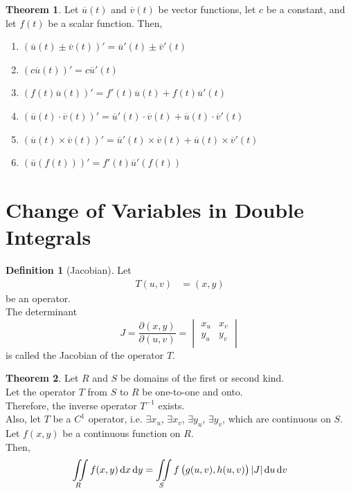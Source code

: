 \documentclass[fleqn, a4paper, 12pt, twoside]{article}
\theoremstyle{definition}
\newtheorem{definition}{Definition}
\theoremstyle{theorem}
\newtheorem{theorem}{Theorem}
\begin{document}
{\begin{theorem}
	Let $\overline{u}(t)$ and $\overline{v}(t)$ be vector functions, let $c$ be a constant, and let $f(t)$ be a scalar function.
	Then,
	\begin{enumerate}
		\item $\left( \overline{u}(t) \pm \overline{v}(t) \right)' = \overline{u}'(t) \pm \overline{v}'(t)$
		\item $\left( c \overline{u}(t) \right)' = c \overline{u}'(t)$
		\item $\left( f(t) \overline{u}(t) \right)' = f'(t) \overline{u}(t) + f(t) \overline{u}'(t)$
		\item $\left( \overline{u}(t) \cdot \overline{v}(t) \right)' = \overline{u}'(t) \cdot \overline{v}(t) + \overline{u}(t) \cdot \overline{v}'(t)$
		\item $\left( \overline{u}(t) \times \overline{v}(t) \right)' = \overline{u}'(t) \times \overline{v}(t) + \overline{u}(t) \times \overline{v}'(t)$
		\item $\left( \overline{u}\left( f(t) \right) \right)' = f'(t) \overline{u}'\left( f(t) \right)$
	\end{enumerate}
\end{theorem}

\section{Change of Variables in Double Integrals}

\begin{definition}[Jacobian]
	Let
	\begin{align*}
		T(u,v) & = (x,y)
	\end{align*}
	be an operator.\\
	The determinant
	\begin{equation*}
		J = \frac{\partial(x,y)}{\partial(u,v)} =
			\begin{vmatrix}
				x_u & x_v \\
				y_u & y_v \\
			\end{vmatrix}
	\end{equation*}
	is called the Jacobian of the operator $T$.
\end{definition}

\begin{theorem}
	Let $R$ and $S$ be domains of the first or second kind.\\
	Let the operator $T$ from $S$ to $R$ be one-to-one and onto.\\
	Therefore, the inverse operator $T^{-1}$ exists.\\
	Also, let $T$ be a $C^1$ operator, i.e. $\exists x_u$, $\exists x_v$, $\exists y_u$, $\exists y_v$, which are continuous on $S$.\\
	Let $f(x,y)$ be a continuous function on $R$.\\
	Then,
	\begin{equation*}
		\iint\limits_{R} f(x,y) \dif x \dif y = \iint\limits_{S} f\left( g(u,v), h(u,v) \right) |J| \dif u \dif v
	\end{equation*}
\end{theorem}

}
\end{document}
